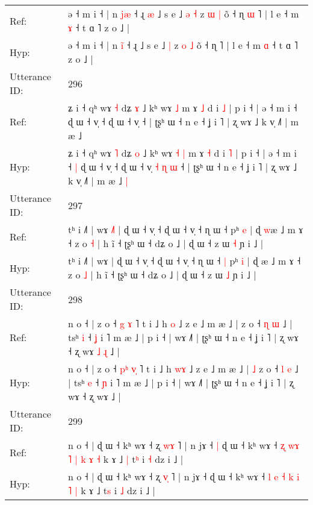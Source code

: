\documentclass[10pt]{article}
\DeclareRobustCommand{\hl}[1]{{\textcolor{red}{#1}}}
\begin{document}
\begin{longtable}{ll}
Ref: & ə ˧ m i ˧ | n \hl{j}\hl{æ} ˧ ɻ\hl{ }\hl{æ} ˩ s e ˩\hl{ }\hl{ə} \hl{˧} z \hl{ɯ} \hl{|} õ ˧ ɳ\hl{ }\hl{ɯ} ˥ | l e ˧ m \hl{ɤ} ˧ t ɑ ˥ z o ˩ |
 \\
Hyp: & ə ˧ m i ˧ | n \hl{i}\hl{̃} ˧ ɻ\hl{}\hl{} ˩ s e ˩\hl{}\hl{} \hl{|} z \hl{o} \hl{˩} õ ˧ ɳ\hl{}\hl{} ˥ | l e ˧ m \hl{ɑ} ˧ t ɑ ˥ z o ˩ |
 \\
\midrule
Utterance ID: & 296 \\
Ref: & ʑ i ˧ qʰ wɤ \hl{˧} dʑ \hl{ɤ} ˩ kʰ wɤ\hl{}\hl{} \hl{˩} m ɤ \hl{˩} d i \hl{˩} | p i ˧ | ə ˧ m i ˧\hl{}\hl{} ɖ ɯ ˧ v̩ ˧ ɖ ɯ ˧ v̩\hl{}\hl{}\hl{}\hl{}\hl{}\hl{} ˧ | ʈʂʰ ɯ ˧ n e ˧ ʝ i ˥ | ʐ wɤ ˩ k v̩ ˩˥ | m æ ˩\hl{}\hl{}
 \\
Hyp: & ʑ i ˧ qʰ wɤ \hl{˥} dʑ \hl{o} ˩ kʰ wɤ\hl{ }\hl{˧} \hl{|} m ɤ \hl{˧} d i \hl{˥} | p i ˧ | ə ˧ m i ˧\hl{ }\hl{|} ɖ ɯ ˧ v̩ ˧ ɖ ɯ ˧ v̩\hl{ }\hl{˧}\hl{ }\hl{ɳ}\hl{ }\hl{ɯ} ˧ | ʈʂʰ ɯ ˧ n e ˧ ʝ i ˥ | ʐ wɤ ˩ k v̩ ˩˥ | m æ ˩\hl{ }\hl{|}
 \\
\midrule
Utterance ID: & 297 \\
Ref: & tʰ i ˩˥ | wɤ\hl{ }\hl{˩}\hl{˥} | ɖ ɯ ˧ v̩ ˧ ɖ ɯ ˧ v̩ ˧ ɳ ɯ ˧\hl{}\hl{} pʰ \hl{e} | ɖ \hl{w}æ ˩ m ɤ ˧ z o \hl{˧} | h ĩ ˧ ʈʂʰ ɯ ˧ dʑ o ˩ | ɖ ɯ ˧ z ɯ \hl{˧} ɲ i ˩ |
 \\
Hyp: & tʰ i ˩˥ | wɤ\hl{}\hl{}\hl{} | ɖ ɯ ˧ v̩ ˧ ɖ ɯ ˧ v̩ ˧ ɳ ɯ ˧\hl{ }\hl{|} pʰ \hl{i} | ɖ \hl{}æ ˩ m ɤ ˧ z o \hl{˩} | h ĩ ˧ ʈʂʰ ɯ ˧ dʑ o ˩ | ɖ ɯ ˧ z ɯ \hl{˩} ɲ i ˩ |
 \\
\midrule
Utterance ID: & 298 \\
Ref: & n o ˧ | z o ˧ \hl{}\hl{g} \hl{}\hl{ɤ} ˥ t i ˩ h \hl{}\hl{o} ˩ z e ˩ m æ ˩ |\hl{}\hl{} z o ˧ \hl{ɳ} \hl{ɯ} ˩ | tsʰ \hl{i} ˧ \hl{ʝ} i ˥ m æ ˩ | p i ˧ | wɤ ˩˥ | ʈʂʰ ɯ ˧ n e ˧ ʝ i ˥ | ʐ wɤ ˧ ʐ wɤ\hl{ }\hl{˩}\hl{ }\hl{ɻ} ˩ |
 \\
Hyp: & n o ˧ | z o ˧ \hl{p}\hl{ʰ} \hl{v}\hl{̩} ˥ t i ˩ h \hl{w}\hl{ɤ} ˩ z e ˩ m æ ˩ |\hl{ }\hl{˩} z o ˧ \hl{l} \hl{e} ˩ | tsʰ \hl{e} ˧ \hl{ɲ} i ˥ m æ ˩ | p i ˧ | wɤ ˩˥ | ʈʂʰ ɯ ˧ n e ˧ ʝ i ˥ | ʐ wɤ ˧ ʐ wɤ\hl{}\hl{}\hl{}\hl{} ˩ |
 \\
\midrule
Utterance ID: & 299 \\
Ref: & n o ˧ | ɖ ɯ ˧ kʰ wɤ ˧ ʐ \hl{w}\hl{ɤ} ˥ | n jɤ ˧\hl{ }\hl{|} ɖ ɯ ˧ kʰ wɤ ˧ \hl{ʐ} \hl{w}\hl{ɤ} \hl{˥} \hl{|} \hl{k} \hl{ɤ} \hl{˧} k ɤ ˩\hl{ }\hl{|} t\hl{ʰ} i \hl{˧} dz i ˩ |
 \\
Hyp: & n o ˧ | ɖ ɯ ˧ kʰ wɤ ˧ ʐ \hl{v}\hl{̩} ˥ | n jɤ ˧\hl{}\hl{} ɖ ɯ ˧ kʰ wɤ ˧ \hl{l} \hl{}\hl{e} \hl{˧} \hl{k} \hl{i} \hl{˥} \hl{|} k ɤ ˩\hl{}\hl{} t\hl{s} i \hl{˩} dz i ˩ |
 \\

\end{longtable}
\end{document}
